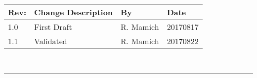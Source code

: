 \documentclass[]{BasiliskReportMemo}
\begin{document}
	
	\makeCover
	
\pagestyle{empty}
{\renewcommand{\arraystretch}{2}
	\noindent
	\begin{longtable}{|p{0.5in}|p{3.5in}|p{1.0in}|p{1.0in}|}
		\hline
		{\bfseries Rev}: & {\bfseries Change Description} & {\bfseries By}  & {\bfseries Date}\\
		\hline
		1.0 & First Draft & R. Mamich & 20170817\\
		\hline
		1.1 & Validated & R. Mamich & 20170822\\
		\hline
		
	\end{longtable}
}
	
	
	
	\newpage
	\setcounter{page}{1}
	\pagestyle{fancy}
	
	\tableofcontents %
	~\\ \hrule ~\\ %
	
	
	
	
	
	
	
	
	
	
	
	
	
	
	
\end{document}
